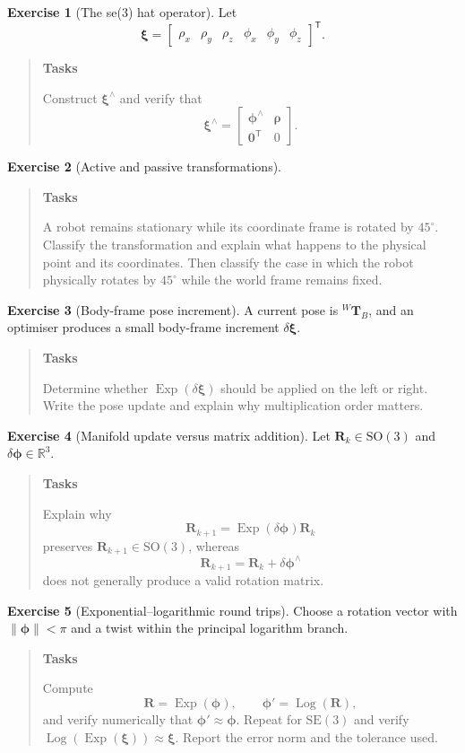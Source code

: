 \documentclass[10pt,a4paper]{article}
\numberwithin{equation}{section}
\newcommand{\SOthree}{\mathrm{SO}(3)}
\newcommand{\SEthree}{\mathrm{SE}(3)}
\newcommand{\Exp}{\operatorname{Exp}}
\newcommand{\Log}{\operatorname{Log}}
\newcommand{\vect}[1]{\boldsymbol{#1}}
\theoremstyle{definition}
\theoremstyle{exercisestyle}
\newtheorem{exercise}{Exercise}[section]
\newenvironment{tasks}
    {\par\begin{quote}\small\textbf{Tasks}\par\smallskip}
    {\end{quote}}
\begin{document}
\begin{exercise}[The se(3) hat operator]
Let
\[
    \vect{\xi}=\begin{bmatrix}
        \rho_x&\rho_y&\rho_z&\phi_x&\phi_y&\phi_z
    \end{bmatrix}^{\mathsf T}.
\]
\begin{tasks}
Construct $\vect{\xi}^\wedge$ and verify that
\[
    \vect{\xi}^\wedge=
    \begin{bmatrix}
        \vect{\phi}^\wedge&\vect{\rho}\\\mathbf{0}^{\mathsf T}&0
    \end{bmatrix}.
\]
\end{tasks}
\end{exercise}

\begin{exercise}[Active and passive transformations]
\begin{tasks}
A robot remains stationary while its coordinate frame is rotated by
$45^\circ$. Classify the transformation and explain what happens to the
physical point and its coordinates. Then classify the case in which the robot
physically rotates by $45^\circ$ while the world frame remains fixed.
\end{tasks}
\end{exercise}

\begin{exercise}[Body-frame pose increment]
A current pose is ${}^W\mathbf{T}_B$, and an optimiser produces a small
body-frame increment $\delta\vect{\xi}$.
\begin{tasks}
Determine whether $\Exp(\delta\vect{\xi})$ should be applied on the left or
right. Write the pose update and explain why multiplication order matters.
\end{tasks}
\end{exercise}

\begin{exercise}[Manifold update versus matrix addition]
Let $\mathbf{R}_k\in\SOthree$ and
$\delta\vect{\phi}\in\mathbb{R}^3$.
\begin{tasks}
Explain why
\[
    \mathbf{R}_{k+1}=\Exp(\delta\vect{\phi})\mathbf{R}_k
\]
preserves $\mathbf{R}_{k+1}\in\SOthree$, whereas
\[
    \mathbf{R}_{k+1}=\mathbf{R}_k+\delta\vect{\phi}^\wedge
\]
does not generally produce a valid rotation matrix.
\end{tasks}
\end{exercise}

\begin{exercise}[Exponential--logarithmic round trips]
Choose a rotation vector with $\|\vect{\phi}\|<\pi$ and a twist within the
principal logarithm branch.
\begin{tasks}
Compute
\[
    \mathbf{R}=\Exp(\vect{\phi}),
    \qquad
    \vect{\phi}'=\Log(\mathbf{R}),
\]
and verify numerically that $\vect{\phi}'\approx\vect{\phi}$. Repeat for
$\SEthree$ and verify
$\Log(\Exp(\vect{\xi}))\approx\vect{\xi}$. Report the error norm and the
tolerance used.
\end{tasks}
\end{exercise}
\end{document}
